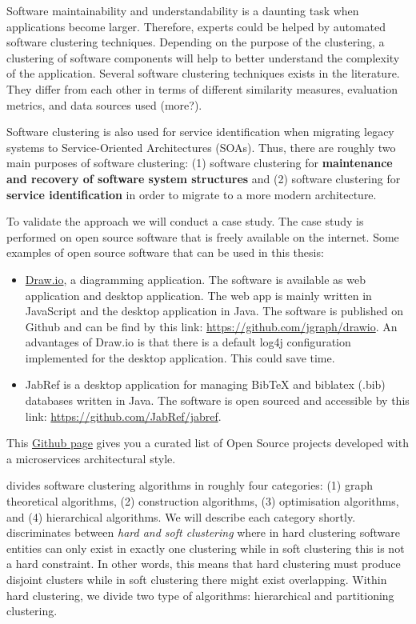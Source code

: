Software maintainability and understandability is a daunting task when applications become larger. Therefore, experts could be helped by automated software clustering techniques. Depending on the purpose of the clustering, a clustering of software components will help to better understand the complexity of the application. Several software clustering techniques exists in the literature. They differ from each other in terms of different similarity measures, evaluation metrics, and data sources used (more?). \par
Software clustering is also used for service identification when migrating legacy systems to Service-Oriented Architectures (SOAs). Thus, there are roughly two main purposes of software clustering: (1) software clustering for \textbf{maintenance and recovery of software system structures} and (2) software clustering for \textbf{service identification} in order to migrate to a more modern architecture.

To validate the approach we will conduct a case study. The case study is performed on open source software that is freely available on the internet. Some examples of open source software that can be used in this thesis:
\begin{itemize}
    \item \href{https://app.diagrams.net/}{Draw.io}, a diagramming application. The software is available as web application and desktop application. The web app is mainly written in JavaScript and the desktop application in Java. The software is published on Github and can be find by this link: \href{https://github.com/jgraph/drawio}{https://github.com/jgraph/drawio}. An advantages of Draw.io is that there is a default log4j configuration implemented for the desktop application. This could save time. 
    \item JabRef is a desktop application for managing BibTeX and biblatex (.bib) databases written in Java. The software is open sourced and accessible by this link: \href{https://github.com/JabRef/jabref}{https://github.com/JabRef/jabref}.
\end{itemize}

This \href{https://github.com/davidetaibi/Microservices_Project_List/blob/master/README.md}{Github page} gives you a curated list of Open Source projects developed with a microservices architectural style.



\citeauthor{wiggerts1997using} \cite{wiggerts1997using} divides software clustering algorithms in roughly four categories: (1) graph theoretical algorithms, (2) construction algorithms, (3) optimisation algorithms, and (4) hierarchical algorithms. We will describe each category shortly. \citeauthor{alsarhan2020software} \cite{alsarhan2020software} discriminates between \textit{hard and soft clustering} where in hard clustering software entities can only exist in exactly one clustering while in soft clustering this is not a hard constraint. In other words, this means that hard clustering must produce disjoint clusters while in soft clustering there might exist overlapping. Within hard clustering, we divide two type of algorithms: hierarchical and partitioning clustering. 

